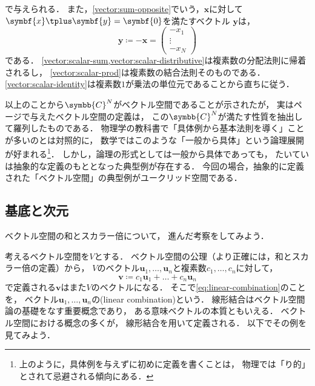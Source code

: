 \documentclass[
]{sotsu}
\begin{document}
で与えられる．
また，\cref{vector:sum-opposite}でいう，$\symbf{x}$に対して$\symbf{x} \vecplus \symbf{y} = \symbf{0}$を満たすベクトル
$\symbf{y}$は，
\begin{equation*}
    \symbf{y} \coloneq 
    -\symbf{x} =
    \begin{pmatrix}
        -x_1  \\  \vdots  \\  -x_N
    \end{pmatrix}
\end{equation*}
である．
\cref{vector:scalar-sum,vector:scalar-distributive}は複素数の分配法則に帰着されるし，
\cref{vector:scalar-prod}は複素数の結合法則そのものである．
\cref{vector:scalar-identity}は複素数$1$が乗法の単位元であることから直ちに従う．

以上のことから$\symbb{C}^N$がベクトル空間であることが示されたが，
実は\pageref{vector:sum-associative}ページで与えたベクトル空間の定義は，
この$\symbb{C}^N$が満たす性質を抽出して羅列したものである．
物理学の教科書で「具体例から基本法則を導く」ことが多いのとは対照的に，
数学ではこのような「一般から具体」という論理展開が好まれる\footnote{
    上のように，具体例を与えずに初めに定義を書くことは，
    物理では「り的」とされて忌避される傾向にある．
}．
しかし，論理の形式としては一般から具体であっても，
たいていは抽象的な定義のもととなった典型例が存在する．
今回の場合，抽象的に定義された「ベクトル空間」の典型例がユークリッド空間である．




\subsection{基底と次元}

ベクトル空間の和とスカラー倍について，
進んだ考察をしてみよう．

考えるベクトル空間を$V$とする．
ベクトル空間の公理（より正確には，和とスカラー倍の定義）から，
$V$のベクトル$\symbf{u}_1, \dots, \symbf{u}_n$と複素数$c_1, \dots, c_n$に対して，
\begin{equation}
    \label{eq:linear-combination}
    \symbf{v} \coloneq c_1 \symbf{u}_1 + \dots + c_n \symbf{u}_n
\end{equation}
で定義される$\symbf{v}$はまた$V$のベクトルになる．
そこで\cref{eq:linear-combination}のことを，
ベクトル$\symbf{u}_1, \dots, \symbf{u}_n$の(linear combination)という．
線形結合はベクトル空間論の基礎をなす重要概念であり，
ある意味ベクトルの本質ともいえる．
ベクトル空間における概念の多くが，
線形結合を用いて定義される．
以下でその例を見てみよう．
\end{document}
